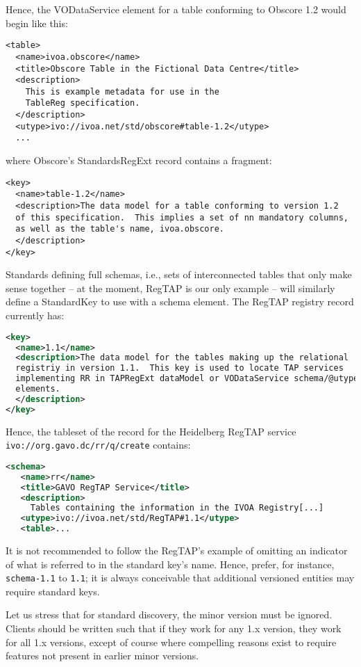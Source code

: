 \documentclass[11pt,a4paper]{ivoa}
\begin{document}
Hence, the VODataService  element for a table conforming to
Obscore 1.2 would begin like this:
\begin{lstlisting}
<table>
  <name>ivoa.obscore</name>
  <title>Obscore Table in the Fictional Data Centre</title>
  <description>
    This is example metadata for use in the
    TableReg specification.
  </description>
  <utype>ivo://ivoa.net/std/obscore#table-1.2</utype>
  ...
\end{lstlisting}
where Obscore's StandardsRegExt record contains a fragment:
\begin{lstlisting}
<key>
  <name>table-1.2</name>
  <description>The data model for a table conforming to version 1.2
  of this specification.  This implies a set of nn mandatory columns,
  as well as the table's name, ivoa.obscore.
  </description>
</key>
\end{lstlisting}

Standards defining full schemas, i.e., sets of interconnected tables
that only make sense together -- at the moment, RegTAP is our only
example -- will similarly define a StandardKey to use with a schema
element.  The RegTAP registry record currently has:

\begin{lstlisting}[language=XML]
<key>
  <name>1.1</name>
  <description>The data model for the tables making up the relational
  registriy in version 1.1.  This key is used to locate TAP services
  implementing RR in TAPRegExt dataModel or VODataService schema/@utype
  elements.
  </description>
</key>
\end{lstlisting}

Hence, the tableset of the record for the Heidelberg RegTAP service
\nolinkurl{ivo://org.gavo.dc/rr/q/create} contains:

\begin{lstlisting}[language=XML]
<schema>
   <name>rr</name>
   <title>GAVO RegTAP Service</title>
   <description>
     Tables containing the information in the IVOA Registry[...]
   <utype>ivo://ivoa.net/std/RegTAP#1.1</utype>
   <table>...
\end{lstlisting}

It is not recommended to follow the RegTAP's example of omitting an
indicator of what is referred to in the standard key's name.  Hence,
prefer, for instance, \verb|schema-1.1| to \verb|1.1|; it is always
conceivable that additional versioned entities may require standard
keys.

Let us stress that for standard discovery, the minor
version must be ignored.  Clients should be written such that if they
work for any 1.x version, they work for all 1.x versions, except of
course where compelling reasons exist to require features not present in
earlier minor versions.
\end{document}

